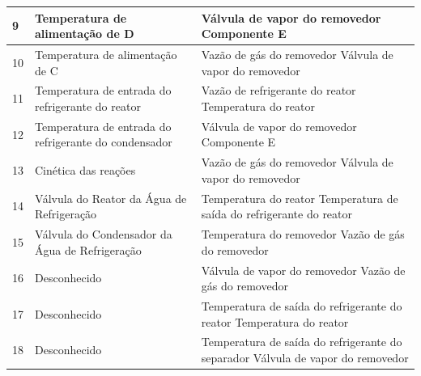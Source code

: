 \documentclass[
	12pt,				%
	openright,			%
	oneside,			%
	a4paper,			%
	english,			%
	french,				%
	spanish,			%
	brazil				%
	]{abntex2}
\begin{document}
\begin{apendicesenv}
\begin{table}[!htbp]
\begin{tabularx}{\textwidth}{|l|X|X|}
      9                       & Temperatura de alimentação de D                       & Válvula de vapor do removedor \newline Componente E                                      \\ \hline
      10                      & Temperatura de alimentação de C                       & Vazão de gás do removedor \newline Válvula de vapor do removedor                         \\ \hline
      11                      & Temperatura de entrada do refrigerante do reator      & Vazão de refrigerante do reator \newline Temperatura do reator                           \\ \hline
      12                      & Temperatura de entrada do refrigerante do condensador & Válvula de vapor do removedor \newline Componente E                                      \\ \hline
      13                      & Cinética das reações                                  & Vazão de gás do removedor \newline Válvula de vapor do removedor                         \\ \hline
      14                      & Válvula do Reator da Água de Refrigeração             & Temperatura do reator \newline Temperatura de saída do refrigerante do reator            \\ \hline
      15                      & Válvula do Condensador da Água de Refrigeração        & Temperatura do removedor \newline Vazão de gás do removedor                              \\ \hline
      16                      & Desconhecido                                          & Válvula de vapor do removedor \newline Vazão de gás do removedor                         \\ \hline
      17                      & Desconhecido                                          & Temperatura de saída do refrigerante do reator \newline Temperatura do reator            \\ \hline
      18                      & Desconhecido                                          & Temperatura de saída do refrigerante do separador \newline Válvula de vapor do removedor \\ \hline

\end{tabularx}
\end{table}
\end{apendicesenv}
\end{document}
